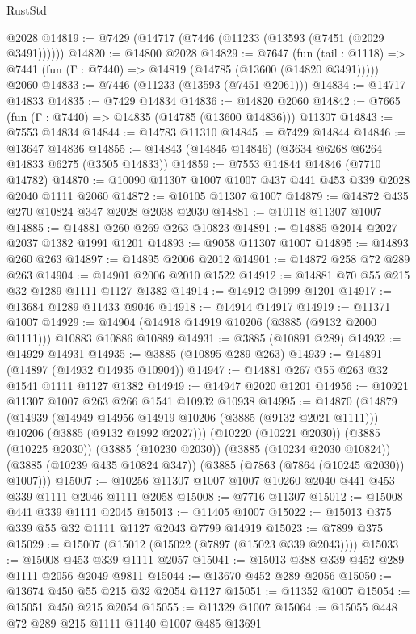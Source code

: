 \begin{lexlean}{RustStd}
\begin{coremodule}
    @2028
@14819 := @7429 (@14717 (@7446 (@11233 (@13593 (@7451 (@2029 @3491))))))
@14820 := @14800 @2028
@14829 := @7647
    (fun (tail : @1118) => @7441 (fun (Γ : @7440) => @14819 (@14785 (@13600 (@14820 @3491)))))
    @2060
@14833 := @7446 (@11233 (@13593 (@7451 @2061)))
@14834 := @14717 @14833
@14835 := @7429 @14834
@14836 := @14820 @2060
@14842 := @7665 (fun (Γ : @7440) => @14835 (@14785 (@13600 @14836))) @11307
@14843 := @7553 @14834
@14844 := @14783 @11310
@14845 := @7429 @14844
@14846 := @13647 @14836
@14855 := @14843 (@14845 @14846) (@3634 @6268 @6264 @14833 @6275 (@3505 @14833))
@14859 := @7553 @14844 @14846 (@7710 @14782)
@14870 := @10090 @11307 @1007 @1007 @437 @441 @453 @339 @2028 @2040 @1111 @2060
@14872 := @10105 @11307 @1007
@14879 := @14872 @435 @270 @10824 @347 @2028 @2038 @2030
@14881 := @10118 @11307 @1007
@14885 := @14881 @260 @269 @263 @10823
@14891 := @14885 @2014 @2027 @2037 @1382 @1991 @1201
@14893 := @9058 @11307 @1007
@14895 := @14893 @260 @263
@14897 := @14895 @2006 @2012
@14901 := @14872 @258 @72 @289 @263
@14904 := @14901 @2006 @2010 @1522
@14912 := @14881 @70 @55 @215 @32 @1289 @1111 @1127 @1382
@14914 := @14912 @1999 @1201
@14917 := @13684 @1289 @11433 @9046
@14918 := @14914 @14917
@14919 := @11371 @1007
@14929 := @14904 (@14918 @14919 @10206 (@3885 (@9132 @2000 @1111))) @10883 @10886 @10889
@14931 := @3885 (@10891 @289)
@14932 := @14929 @14931
@14935 := @3885 (@10895 @289 @263)
@14939 := @14891 (@14897 (@14932 @14935 @10904))
@14947 := @14881 @267 @55 @263 @32 @1541 @1111 @1127 @1382
@14949 := @14947 @2020 @1201
@14956 := @10921 @11307 @1007 @263 @266 @1541 @10932 @10938
@14995 := @14870
    (@14879
      (@14939
        (@14949 @14956 @14919 @10206 (@3885 (@9132 @2021 @1111)))
        @10206
        (@3885 (@9132 @1992 @2027)))
      (@10220 (@10221 @2030))
      (@3885 (@10225 @2030))
      (@3885 (@10230 @2030))
      (@3885 (@10234 @2030 @10824))
      (@3885 (@10239 @435 @10824 @347))
      (@3885 (@7863 (@7864 (@10245 @2030)) @1007)))
@15007 := @10256 @11307 @1007 @1007 @10260 @2040 @441 @453 @339 @1111 @2046 @1111 @2058
@15008 := @7716 @11307
@15012 := @15008 @441 @339 @1111 @2045
@15013 := @11405 @1007
@15022 := @15013 @375 @339 @55 @32 @1111 @1127 @2043 @7799 @14919
@15023 := @7899 @375
@15029 := @15007 (@15012 (@15022 (@7897 (@15023 @339 @2043))))
@15033 := @15008 @453 @339 @1111 @2057
@15041 := @15013 @388 @339 @452 @289 @1111 @2056 @2049 @9811
@15044 := @13670 @452 @289 @2056
@15050 := @13674 @450 @55 @215 @32 @2054 @1127
@15051 := @11352 @1007
@15054 := @15051 @450 @215 @2054
@15055 := @11329 @1007
@15064 := @15055 @448 @72 @289 @215 @1111 @1140 @1007 @485 @13691

\end{coremodule}
\end{lexlean}
